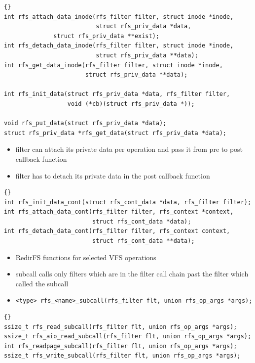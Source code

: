 \documentclass[30pt,a4paper,landscape,headrule,footrule]{foils}
\begin{document}
\begin{lstlisting}[frame=trbl]{}
int rfs_attach_data_inode(rfs_filter filter, struct inode *inode,
                          struct rfs_priv_data *data,
			  struct rfs_priv_data **exist);
int rfs_detach_data_inode(rfs_filter filter, struct inode *inode,
                          struct rfs_priv_data **data);
int rfs_get_data_inode(rfs_filter filter, struct inode *inode,
                       struct rfs_priv_data **data);

int rfs_init_data(struct rfs_priv_data *data, rfs_filter filter,
                  void (*cb)(struct rfs_priv_data *));

void rfs_put_data(struct rfs_priv_data *data);
struct rfs_priv_data *rfs_get_data(struct rfs_priv_data *data);
\end{lstlisting}

\begin{itemize}
\item filter can attach its private data per operation and pass it from pre to
post callback function
\item filter has to detach its private data in the post callback function
\end{itemize}

\begin{lstlisting}[frame=trbl]{}
int rfs_init_data_cont(struct rfs_cont_data *data, rfs_filter filter);
int rfs_attach_data_cont(rfs_filter filter, rfs_context *context,
                         struct rfs_cont_data *data);
int rfs_detach_data_cont(rfs_filter filter, rfs_context context,
                         struct rfs_cont_data **data);
\end{lstlisting}

\begin{itemize}
\item RedirFS functions for selected VFS operations
\item subcall calls only filters which are in the filter call chain past the
filter which called the subcall
\item \texttt{\small{<type> rfs\_<name>\_subcall(rfs\_filter flt, union
rfs\_op\_args *args);}}
\end{itemize}

\begin{lstlisting}[frame=trbl]{}
ssize_t rfs_read_subcall(rfs_filter flt, union rfs_op_args *args);
ssize_t rfs_aio_read_subcall(rfs_filter flt, union rfs_op_args *args);
int rfs_readpage_subcall(rfs_filter flt, union rfs_op_args *args);
ssize_t rfs_write_subcall(rfs_filter flt, union rfs_op_args *args);
\end{lstlisting}
\end{document}
